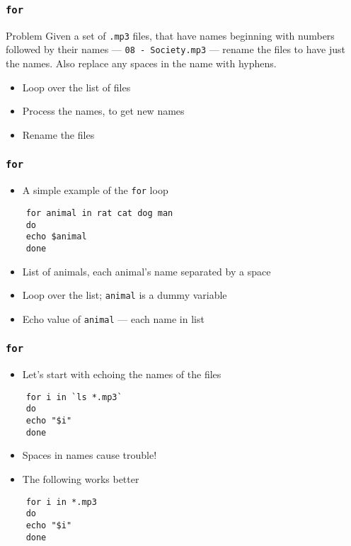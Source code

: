 \documentclass[12pt,compress]{beamer}
\begin{document}
\begin{frame}[fragile]
  \frametitle{\texttt{for}}
  \begin{block}{Problem}
    Given a set of \texttt{.mp3} files, that have names beginning with
    numbers followed by their names --- \texttt{08 - Society.mp3} ---
    rename the files to have just the names. Also replace any spaces
    in the name with hyphens. 
  \end{block}
  \begin{itemize}
  \item Loop over the list of files
  \item Process the names, to get new names
  \item Rename the files
  \end{itemize}
\end{frame}

\begin{frame}[fragile]
  \frametitle{\texttt{for}} 
  \begin{itemize}
  \item A simple example of the \texttt{for} loop
  \end{itemize}
  \begin{lstlisting}
    for animal in rat cat dog man
    do 
    echo $animal
    done
  \end{lstlisting} %
  \begin{itemize}
  \item List of animals, each animal's name separated by a space
  \item Loop over the list; \texttt{animal} is a dummy variable
  \item Echo value of \texttt{animal} ---  each name in list
  \end{itemize}
\end{frame}

\begin{frame}[fragile]
  \frametitle{\texttt{for}}
  \begin{itemize}
  \item Let's start with echoing the names of the files
  \end{itemize}
  \begin{lstlisting}
    for i in `ls *.mp3`
    do
    echo "$i"
    done
  \end{lstlisting} %
  \begin{itemize}
  \item Spaces in names cause trouble!
  \item The following works better
  \end{itemize}
  \begin{lstlisting}
    for i in *.mp3
    do
    echo "$i"
    done
  \end{lstlisting} %
\end{frame}
\end{document}
